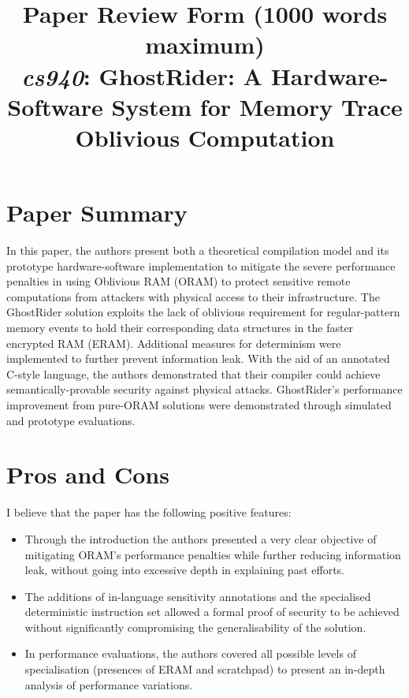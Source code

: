 \documentclass[11pt]{article}
\begin{document}
\title{Paper Review Form (1000 words maximum)\\
  \emph{cs940}: GhostRider: A Hardware-Software System for Memory Trace Oblivious Computation \cite{liu2015ghostrider}}
\maketitle

\section*{Paper Summary}

In this paper, the authors present both a theoretical compilation model and its prototype hardware-software implementation to mitigate the severe performance penalties in using Oblivious RAM (ORAM) to protect sensitive remote computations from attackers with physical access to their infrastructure. The GhostRider solution exploits the lack of oblivious requirement for regular-pattern memory events  to hold their corresponding data structures in the faster encrypted RAM (ERAM). Additional measures for determinism were implemented to further prevent information leak. With the aid of an annotated C-style language, the authors demonstrated that their compiler could achieve semantically-provable security against physical attacks. GhostRider's performance improvement from pure-ORAM solutions were demonstrated through simulated and prototype evaluations.

\section*{Pros and Cons}

I believe that the paper has the following positive features:
\begin{itemize}
	\item Through the introduction the authors presented a very clear objective of mitigating ORAM's performance penalties while further reducing information leak, without going into excessive depth in explaining past efforts.
	\item The additions of in-language sensitivity annotations and the specialised deterministic instruction set allowed a formal proof of security to be achieved without significantly compromising the generalisability of the solution.
	\item In performance evaluations, the authors covered all possible levels of specialisation (presences of ERAM and scratchpad) to present an in-depth analysis of performance variations.
\end{itemize}
\end{document}
